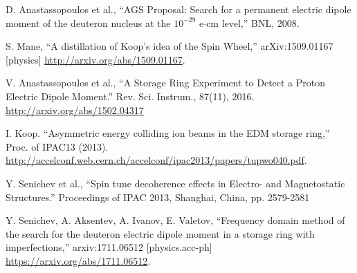 \documentclass[a4paper]{jacow}
\begin{document}

\begin{thebibliography}{9}
  
  D. Anastassopoulos et al., ``AGS Proposal: Search for a permanent electric dipole moment of
  the deuteron nucleus at the $10^{-29}$ e$\cdot$cm level,'' BNL, 2008.

  S. Mane, ``A distillation of Koop's idea of the Spin Wheel,'' arXiv:1509.01167 [physics]
  \url{http://arxiv.org/abs/1509.01167}.

  V. Anastassopoulos et al., ``A Storage Ring Experiment to Detect a Proton Electric Dipole Moment.''
  Rev. Sci. Instrum., 87(11), 2016.
  \url{http://arxiv.org/abs/1502.04317}

  I. Koop. ``Asymmetric energy colliding ion beams in the EDM storage ring,'' Proc. of IPAC13 (2013).
  \url{http://accelconf.web.cern.ch/accelconf/ipac2013/papers/tupwo040.pdf}.

  Y. Senichev et al., ``Spin tune decoherence effects in Electro- and Magnetostatic Structures.''
  Proceedings of IPAC 2013, Shanghai, China, pp. 2579-2581

  Y. Senichev, A. Aksentev, A. Ivanov, E. Valetov, ``Frequency domain method of the search for
  the deuteron electric dipole moment in a storage ring with imperfections,'' arxiv:1711.06512 [physics.acc-ph]
  \url{https://arxiv.org/abs/1711.06512}.


\end{thebibliography}
\end{document}
